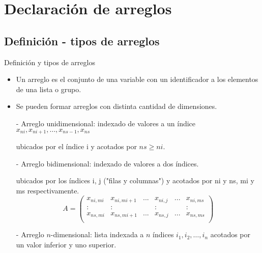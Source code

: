 
\section{Declaración de arreglos}  



\subsection{Definición - tipos de arreglos}

\begin{frame}[fragile]{Definición y tipos de arreglos}
 \begin{itemize}[<+(0)->]
  \item Un arreglo es el conjunto de una variable con un identificador a los elementos de una lista o grupo.
  \item Se pueden formar arreglos con distinta cantidad de dimensiones.
  \item [-] Arreglo unidimensional: indexado de valores a un índice\\ 
  \centering $x_{ni}, x_{ni+1}, \ldots, x_{ns-1}, x_{ns}$
  \item [ ] ubicados por el índice i y acotados por $ns \geq ni$. 
  \item [-] Arreglo bidimensional: indexado de valores a dos índices. 
  \item [ ] ubicados por los índices i, j ("filas y columnas") y acotados por ni y ns, mi y ms respectivamente. \\
            $$
                A = \left( \begin{array}{cccccc}
                    x_{ni,mi}     &x_{ni,mi+1}    &...     &x_{ni,j}     &...      &x_{ni,ms}   \\
                    :             &:              &        &:            &         &:           \\
                    x_{ns,mi}     &x_{ns,mi+1}    &...     &x_{ns,j}     &...      &x_{ns,ms}   \\
                \end{array} \right)
            $$
  \item [-] Arreglo $n$-dimensional: lista indexada a $n$ índices $i_{1}, i_{2}, \ldots, i_{n}$ acotados por un valor inferior y uno superior. 
 \end{itemize}
\end{frame} 


